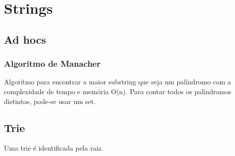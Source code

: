 \section{Strings}

\subsection{Ad hocs}
\subsubsection{Algorítmo de Manacher}
Algor\'{i}tmo para encontrar a maior substring que seja um pal\'{i}ndromo com a complexidade de tempo e mem\'{o}ria O(n).
Para contar todos os palíndromos distintos, pode-se usar um set.

\subsection{Trie}
Uma trie \'{e} identificada pela raiz.
